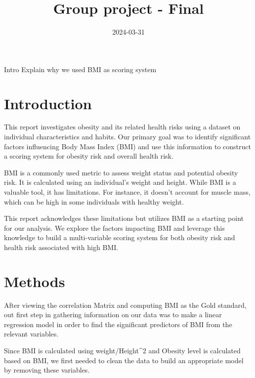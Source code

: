 \documentclass[
]{article}
\title{Group project - Final}
\author{}
\date{\vspace{-2.5em}2024-03-31}
\begin{document}
\maketitle

Intro Explain why we used BMI as scoring system

\hypertarget{introduction}{%
\section{Introduction}\label{introduction}}

This report investigates obesity and its related health risks using a
dataset on individual characteristics and habits. Our primary goal was
to identify significant factors influencing Body Mass Index (BMI) and
use this information to construct a scoring system for obesity risk and
overall health risk.

BMI is a commonly used metric to assess weight status and potential
obesity risk. It is calculated using an individual's weight and height.
While BMI is a valuable tool, it has limitations. For instance, it
doesn't account for muscle mass, which can be high in some individuals
with healthy weight.

This report acknowledges these limitations but utilizes BMI as a
starting point for our analysis. We explore the factors impacting BMI
and leverage this knowledge to build a multi-variable scoring system for
both obesity risk and health risk associated with high BMI.

\hypertarget{methods}{%
\section{Methods}\label{methods}}

After viewing the correlation Matrix and computing BMI as the Gold
standard, out first step in gathering information on our data was to
make a linear regression model in order to find the significant
predictors of BMI from the relevant variables.

Since BMI is calculated using weight/Height\^{}2 and Obesity level is
calculated based on BMI, we first needed to clean the data to build an
appropriate model by removing these variables.
\end{document}
